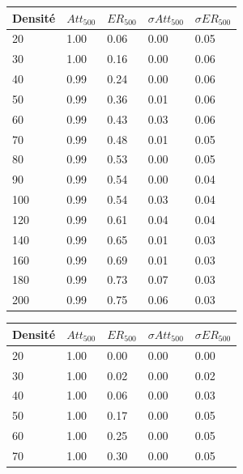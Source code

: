 \documentclass[10pt]{report}
\begin{document}
\begin{figure}[H]
\begin{minipage}[b]{0.5\textwidth} \begin{flushleft}
\centering
\begin{tabular}{|l|l|l|l|l|} \hline
  	Densité & $Att_{500}$ & $ER_{500}$ & $\sigma Att_{500}$ & $\sigma ER_{500}$\\ \hline
	20 & 1.00 & 0.06 & 0.00 & 0.05 \\ \hline
  	30 & 1.00 & 0.16 & 0.00 & 0.06 \\ \hline
  	40 & 0.99 & 0.24 & 0.00 & 0.06 \\ \hline
  	50 & 0.99 & 0.36 & 0.01 & 0.06 \\ \hline
  	60 & 0.99 & 0.43 & 0.03 & 0.06 \\ \hline
  	70 & 0.99 & 0.48 & 0.01 & 0.05 \\ \hline
    80 & 0.99 & 0.53 & 0.00 & 0.05 \\ \hline
  	90 & 0.99 & 0.54 & 0.00 & 0.04 \\ \hline
  	100 & 0.99 & 0.54 & 0.03 & 0.04 \\ \hline
  	120 & 0.99 & 0.61 & 0.04 & 0.04 \\ \hline
  	140 & 0.99 & 0.65 & 0.01 & 0.03 \\ \hline
  	160 & 0.99 & 0.69 & 0.01 & 0.03 \\ \hline
  	180 & 0.99 & 0.73 & 0.07 & 0.03 \\ \hline
  	200 & 0.99 & 0.75 & 0.06 & 0.03 \\ \hline
\end{tabular}
\end{flushleft}\end{minipage}
\begin{minipage}[b]{0.5\textwidth} \begin{flushright}
\centering
\begin{tabular}{|l|l|l|l|l|} \hline
  	Densité & $Att_{500}$ & $ER_{500}$ & $\sigma Att_{500}$ & $\sigma ER_{500}$\\ \hline
	20 & 1.00 & 0.00 & 0.00 & 0.00 \\ \hline
  	30 & 1.00 & 0.02 & 0.00 & 0.02 \\ \hline
  	40 & 1.00 & 0.06 & 0.00 & 0.03 \\ \hline
  	50 & 1.00 & 0.17 & 0.00 & 0.05 \\ \hline
  	60 & 1.00 & 0.25 & 0.00 & 0.05 \\ \hline
  	70 & 1.00 & 0.30 & 0.00 & 0.05 \\ \hline

\end{tabular}
\end{flushright}
\end{minipage}
\end{figure}
\end{document}
